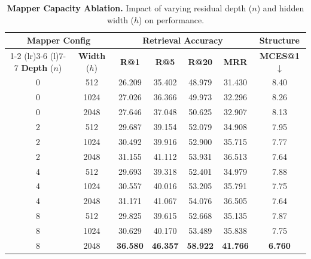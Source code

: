 \begin{table}[h]
\centering
\caption{\textbf{Mapper Capacity Ablation.} Impact of varying residual depth ($n$) and hidden width ($h$) on performance.}
\label{tab:mapper_capacity}
\small
\setlength{\tabcolsep}{5pt}
\begin{tabular}{ccccccc}
\toprule
\multicolumn{2}{c}{\textbf{Mapper Config}} & \multicolumn{4}{c}{\textbf{Retrieval Accuracy}} & \textbf{Structure} \\
\cmidrule(r){1-2} \cmidrule(lr){3-6} \cmidrule(l){7-7}
\textbf{Depth} ($n$) & \textbf{Width} ($h$) & \textbf{R@1} & \textbf{R@5} & \textbf{R@20} & \textbf{MRR} & \textbf{MCES@1} $\downarrow$ \\
\midrule
0 & 512 & 26.209 & 35.402 & 48.979 & 31.430 & 8.40 \\
0 & 1024 & 27.026 & 36.366 & 49.973 & 32.296 & 8.26 \\
0 & 2048 & 27.646 & 37.048 & 50.625 & 32.907 & 8.13 \\
\midrule
2 & 512 & 29.687 & 39.154 & 52.079 & 34.908 & 7.95 \\
2 & 1024 & 30.492 & 39.916 & 52.900 & 35.715 & 7.77 \\
2 & 2048 & 31.155 & 41.112 & 53.931 & 36.513 & 7.64 \\
\midrule
4 & 512 & 29.693 & 39.318 & 52.401 & 34.979 & 7.88 \\
4 & 1024 & 30.557 & 40.016 & 53.205 & 35.791 & 7.75 \\
4 & 2048 & 31.171 & 41.067 & 54.076 & 36.505 & 7.64 \\
\midrule
8 & 512 & 29.825 & 39.615 & 52.668 & 35.135 & 7.87 \\
8 & 1024 & 30.629 & 40.170 & 53.489 & 35.838 & 7.75 \\
8 & 2048 & \textbf{36.580} & \textbf{46.357} & \textbf{58.922} & \textbf{41.766} & \textbf{6.760} \\
\bottomrule
\end{tabular}
\end{table}



